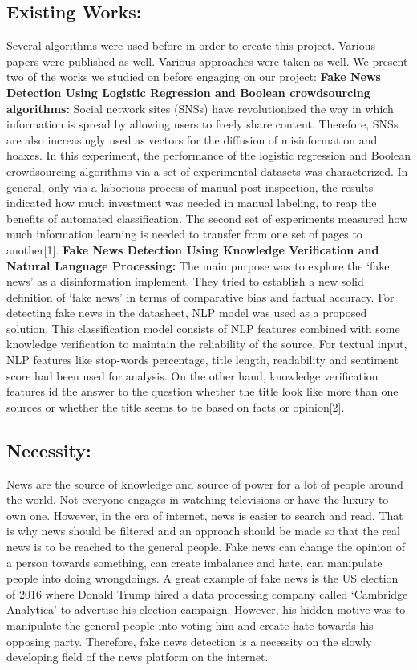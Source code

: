 \documentclass{article}
\begin{document}
    \subsection{Existing Works:}
    Several algorithms were used before in order to create this project. Various papers were published as well. Various approaches were taken as well. We present two of the works we studied on before engaging on our project:\break\break
    \textbf{Fake News Detection Using Logistic Regression and Boolean crowdsourcing algorithms:}
 Social network sites (SNSs) have revolutionized the way in which information is spread by allowing users to freely share content. Therefore, SNSs are also increasingly used as vectors for the diffusion of misinformation and hoaxes. In this experiment, the performance of the logistic regression and Boolean crowdsourcing algorithms via a set of experimental datasets was characterized. In general, only via a laborious process of manual post inspection, the results indicated how much investment was needed in manual labeling, to reap the benefits of automated classification. The second set of experiments measured how much information learning is needed to transfer from one set of pages to another[1].\break\break
\textbf{Fake News Detection Using Knowledge Verification and Natural Language Processing:} The main purpose was to explore the ‘fake news’ as a disinformation implement. They tried to establish a new solid definition of ‘fake news’ in terms of comparative bias and factual accuracy. For detecting fake news in the datasheet, NLP model was used as a proposed solution. This classification model consists of NLP features combined with some knowledge verification to maintain the reliability of the source. For textual input, NLP features like stop-words percentage, title length, readability and sentiment score had been used for analysis. On the other hand, knowledge verification features id the answer to the question whether the title look like more than one sources or whether the title seems to be based on facts or opinion[2].

 \subsection{Necessity:}
   News are the source of knowledge and source of power for a lot of people around the world. Not everyone engages in watching televisions or have the luxury to own one. However, in the era of internet, news is easier to search and read. That is why news should be filtered and an approach should be made so that the real news is to be reached to the general people. Fake news can change the opinion of a person towards something, can create imbalance and hate, can manipulate people into doing wrongdoings. A great example of fake news is the US election of 2016 where Donald Trump hired a data processing company called ‘Cambridge Analytica’ to advertise his election campaign. However, his hidden motive was to manipulate the general people into voting him and create hate towards his opposing party. Therefore, fake news detection is a necessity on the slowly developing field of the news platform on the internet.
   
\end{document}

